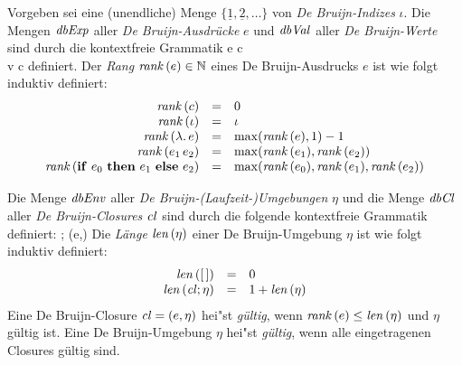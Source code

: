 \documentclass[12pt,fleqn,a4paper]{article}
\newcommand{\cl}{\name{cl}}
\begin{document}
\begin{definition}[Expressions]
  Vorgeben sei eine (unendliche) Menge $\{\underline{1},\underline{2},\ldots\}$ von {\em De Bruijn-Indizes}
  $\iota$. Die Mengen ${\text{\it dbExp\/}}$ aller {\em De Bruijn-Ausdr\"ucke} $e$ und ${\text{\it dbVal\/}}$ aller {\em De Bruijn-Werte}
  sind durch die kontextfreie Grammatik
  \bgram
  e \is c \mid \iota \mid {} \mid {} \mid {} \\
  v \is c \mid {} \mid {}
  \egram
  definiert. Der {\em Rang} ${\text{\it rank\/}}\,(e) \in {\mathord{\mathbb N}}$ eines De Bruijn-Ausdrucks $e$ ist wie folgt induktiv definiert:
  \[\begin{array}{rcl}
    {\text{\it rank\/}}\,(c) &=& 0 \\
    {\text{\it rank\/}}\,(\iota) &=& \iota \\
    {\text{\it rank\/}}\,(\lambda .\,e) &=& \max({\text{\it rank\/}}\,(e),1) - 1 \\
    {\text{\it rank\/}}\,(e_1\,e_2) &=& \max({\text{\it rank\/}}\,(e_1),{\text{\it rank\/}}\,(e_2)) \\
    {\text{\it rank\/}}\,(\mathbf{if}\ e_0\ \mathbf{then}\ e_1\ \mathbf{else}\ e_2) &=& \max({\text{\it rank\/}}\,(e_0),{\text{\it rank\/}}\,(e_1),{\text{\it rank\/}}\,(e_2))
  \end{array}\]
\end{definition}

\begin{definition}
  Die Menge ${\text{\it dbEnv\/}}$ aller {\em De Bruijn-(Laufzeit-)Umgebungen} $\eta$ und die Menge ${\text{\it dbCl\/}}$ aller
  {\em De Bruijn-Closures} $\cl$ sind durch die folgende kontextfreie Grammatik definiert:
  \bgram
  \eta \is [\,] \mid \cl;\eta \n
  \cl \is (e,\eta)
  \egram
  Die {\em L\"ange} ${\text{\it len\/}}\,(\eta)$ einer De Bruijn-Umgebung $\eta$ ist wie folgt induktiv definiert:
  \[\begin{array}{rcl}
    \len{[\,]} &=& 0 \\
    \len{\cl;\eta} &=& 1 + \len{\eta}
  \end{array}\]
  Eine De Bruijn-Closure $\cl = (e,\eta)$ hei"st {\em g\"ultig}, wenn ${\text{\it rank\/}}\,(e) \le {\text{\it len\/}}\,(\eta)$ und
  $\eta$ g\"ultig ist. Eine De Bruijn-Umgebung $\eta$ hei"st {\em g\"ultig}, wenn alle eingetragenen
  Closures g\"ultig sind.
\end{definition}
\end{document}
